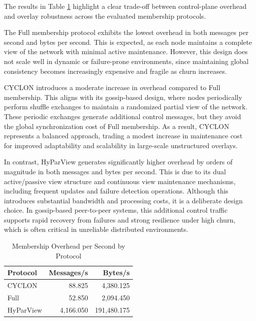 \documentclass[sigconf,a4paper]{acmart}
\begin{document}
The results in Table \ref{tab:membership-overhead} highlight a clear trade-off between 
control-plane overhead and overlay robustness across the evaluated membership protocols.

The Full membership protocol exhibits the lowest overhead in both messages per second and bytes 
per second. This is expected, as each node maintains a complete view of the network with minimal 
active maintenance. However, this design does not scale well in dynamic or failure-prone 
environments, since maintaining global consistency becomes increasingly expensive and fragile 
as churn increases.

CYCLON introduces a moderate increase in overhead compared to Full membership. This aligns 
with its gossip-based design, where nodes periodically perform shuffle exchanges to maintain 
a randomized partial view of the network. These periodic exchanges generate additional control 
messages, but they avoid the global synchronization cost of Full membership. As a result, 
CYCLON represents a balanced approach, trading a modest increase in maintenance cost for 
improved adaptability and scalability in large-scale unstructured overlays.

In contrast, HyParView generates significantly higher overhead by orders of magnitude in 
both messages and bytes per second. This is due to its dual active/passive view structure 
and continuous view maintenance mechanisms, including frequent updates and failure detection 
operations. Although this introduces substantial bandwidth and processing costs, it is a 
deliberate design choice. In gossip-based peer-to-peer systems, this additional control 
traffic supports rapid recovery from failures and strong resilience under high churn, which 
is often critical in unreliable distributed environments.

\begin{table}[h]
\centering
\begin{tabular}{lrr}
\toprule
\textbf{Protocol} & \textbf{Messages/s} & \textbf{Bytes/s} \\
\midrule
CYCLON     &    88.825 &   4{,}380.125 \\
Full       &    52.850 &   2{,}094.450 \\
HyParView  & 4{,}166.050 & 191{,}480.175 \\
\bottomrule
\end{tabular}
\caption{Membership Overhead per Second by Protocol}
\label{tab:membership-overhead}
\end{table}
\end{document}
